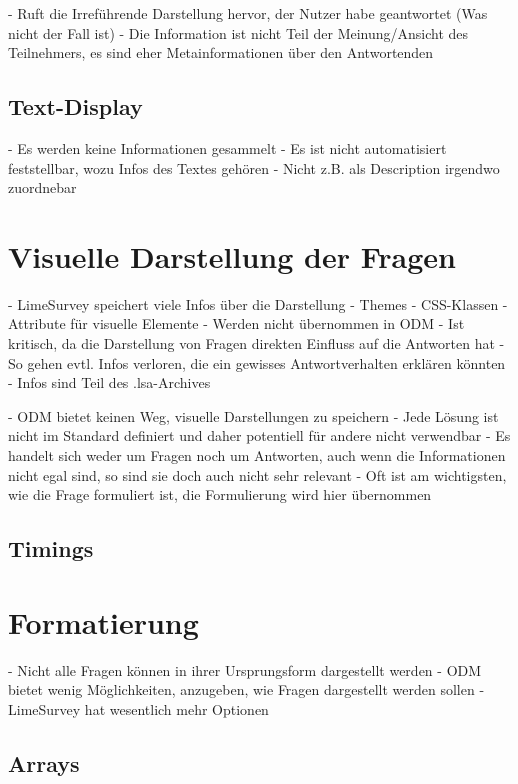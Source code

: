 - Ruft die Irreführende Darstellung hervor, der Nutzer habe geantwortet (Was nicht der Fall ist)
- Die Information ist nicht Teil der Meinung/Ansicht des Teilnehmers, es sind eher Metainformationen über den Antwortenden

\subsection{Text-Display}

- Es werden keine Informationen gesammelt
- Es ist nicht automatisiert feststellbar, wozu Infos des Textes gehören
	- Nicht z.B. als Description irgendwo zuordnebar

\section{Visuelle Darstellung der Fragen}
\label{d:themes}

- LimeSurvey speichert viele Infos über die Darstellung
	- Themes
	- CSS-Klassen
	- Attribute für visuelle Elemente
- Werden nicht übernommen in ODM
- Ist kritisch, da die Darstellung von Fragen direkten Einfluss auf die Antworten hat
	- So gehen evtl. Infos verloren, die ein gewisses Antwortverhalten erklären könnten
- Infos sind Teil des .lsa-Archives

- ODM bietet keinen Weg, visuelle Darstellungen zu speichern
	- Jede Lösung ist nicht im Standard definiert und daher potentiell für andere nicht verwendbar
	- Es handelt sich weder um Fragen noch um Antworten, auch wenn die Informationen nicht egal sind, so sind sie doch auch nicht sehr relevant
- Oft ist am wichtigsten, wie die Frage formuliert ist, die Formulierung wird hier übernommen

\subsection{Timings}

\section{Formatierung}

- Nicht alle Fragen können in ihrer Ursprungsform dargestellt werden
	- ODM bietet wenig Möglichkeiten, anzugeben, wie Fragen dargestellt werden sollen
	- LimeSurvey hat wesentlich mehr Optionen

\subsection{Arrays}

